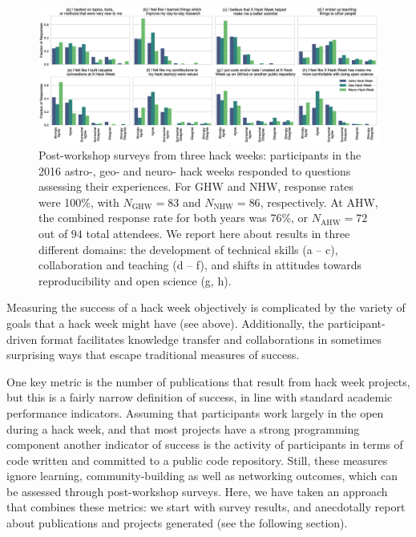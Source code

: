\begin{figure}[h!]
\centering
\includegraphics[width=\textwidth]{f2.eps}
\caption{Post-workshop surveys from three hack weeks: participants in the 2016 astro-, geo- and neuro- hack weeks responded to questions assessing their experiences. For GHW and NHW, response rates were 100\%, with $N_{\mathrm{GHW}}= 83$ and $N_{\mathrm{NHW}} = 86$, respectively. At AHW, the combined response rate for both years was 76\%, or $N_{\mathrm{AHW}} = 72$ out of $94$ total attendees. We report here about results in three different domains: the development of technical skills (a -- c), collaboration and teaching (d -- f), and shifts in attitudes towards reproducibility and open science (g, h).}
\label{fig:survey}
\end{figure}

Measuring the success of a hack week objectively is complicated by the variety of goals that a hack week might have (see above). 
Additionally, the participant-driven format facilitates knowledge transfer and collaborations in sometimes surprising ways that escape traditional measures of success.

One key metric is the number of publications that result from hack week projects, but this is a fairly narrow definition of success, in line with standard academic performance indicators.
Assuming that participants work largely in the open during a hack week, and that most projects have a strong programming component another indicator of success is the activity of participants in terms of code written and committed to a public code repository.
Still, these measures ignore learning, community-building as well as networking outcomes, which can be assessed through post-workshop surveys.
Here, we have taken an approach that combines these metrics: we start with survey results, and anecdotally report about publications and projects generated (see the following section).

